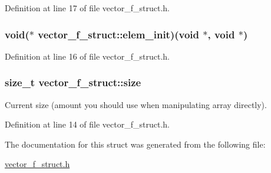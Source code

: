 Definition at line 17 of file vector\-\_\-f\-\_\-struct.\-h.

\hypertarget{structvector__f__struct_a6a837da0e16a7159c7c1801b4a52d406}{
\subsubsection[{elem\-\_\-init}]{\setlength{\rightskip}{0pt plus 5cm}void($\ast$ vector\-\_\-f\-\_\-struct\-::elem\-\_\-init)(void $\ast$, void $\ast$)}}\label{structvector__f__struct_a6a837da0e16a7159c7c1801b4a52d406}


Definition at line 16 of file vector\-\_\-f\-\_\-struct.\-h.

\hypertarget{structvector__f__struct_ada5b7d672a0867d29ec5b134eaa77752}{
\subsubsection[{size}]{\setlength{\rightskip}{0pt plus 5cm}size\-\_\-t vector\-\_\-f\-\_\-struct\-::size}}\label{structvector__f__struct_ada5b7d672a0867d29ec5b134eaa77752}


Current size (amount you should use when manipulating array directly). 



Definition at line 14 of file vector\-\_\-f\-\_\-struct.\-h.



The documentation for this struct was generated from the following file\-:\begin{DoxyCompactItemize}
\item 
\hyperlink{vector__f__struct_8h}{vector\-\_\-f\-\_\-struct.\-h}\end{DoxyCompactItemize}
